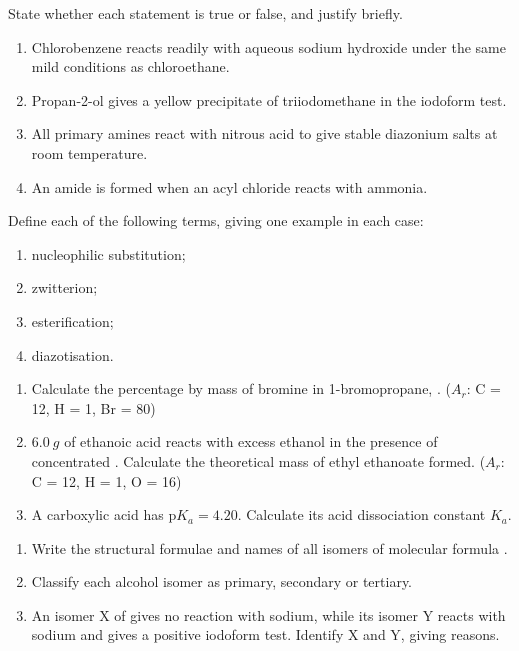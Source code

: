 \documentclass[11pt]{article}
\newcounter{popsec}
\newcounter{popsub}
\newcommand{\courssub}[1]{%
  \stepcounter{popsub}%
  \par\vspace{9pt}\noindent{\popxbold\fontsize{11.5}{13}\selectfont\color{popink}{\color{poporange}\thepopsec.\thepopsub}\hspace{6pt}#1}\par\nopagebreak\vspace{4pt}
}
\begin{document}
\begin{exercice}
State whether each statement is true or false, and justify briefly.
\begin{enumerate}
\item Chlorobenzene reacts readily with aqueous sodium hydroxide under the same mild conditions as chloroethane.
\item Propan-2-ol gives a yellow precipitate of triiodomethane in the iodoform test.
\item All primary amines react with nitrous acid to give stable diazonium salts at room temperature.
\item An amide is formed when an acyl chloride reacts with ammonia.
\end{enumerate}
\end{exercice}

\begin{exercice}[Definitions]
Define each of the following terms, giving one example in each case:
\begin{enumerate}
\item nucleophilic substitution;
\item zwitterion;
\item esterification;
\item diazotisation.
\end{enumerate}
\end{exercice}

\begin{exercice}
\begin{enumerate}
\item Calculate the percentage by mass of bromine in 1-bromopropane, . ($A_r$: C = 12, H = 1, Br = 80)
\item $\SI{6.0}{g}$ of ethanoic acid reacts with excess ethanol in the presence of concentrated . Calculate the theoretical mass of ethyl ethanoate formed. ($A_r$: C = 12, H = 1, O = 16)
\item A carboxylic acid has $\mathrm{p}K_a = 4.20$. Calculate its acid dissociation constant $K_a$.
\end{enumerate}
\end{exercice}

\courssub{I practise}

\begin{exercice}[Isomers of \ce{C4H10O}]
\begin{enumerate}
\item Write the structural formulae and names of all isomers of molecular formula .
\item Classify each alcohol isomer as primary, secondary or tertiary.
\item An isomer X of  gives no reaction with sodium, while its isomer Y reacts with sodium and gives a positive iodoform test. Identify X and Y, giving reasons.
\end{enumerate}
\end{exercice}
\end{document}
